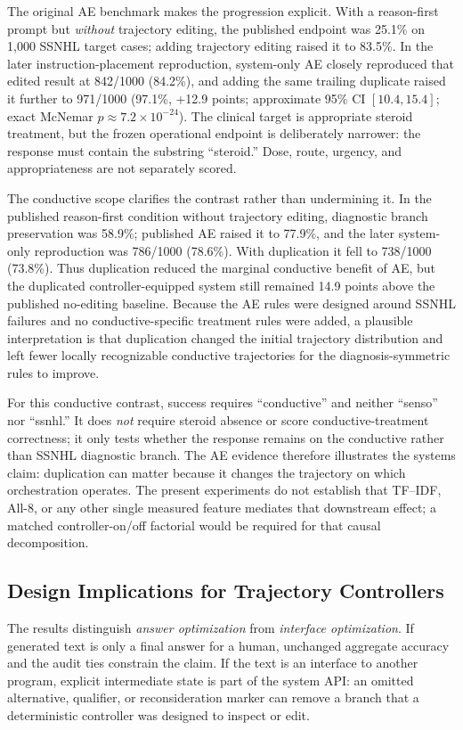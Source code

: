\documentclass[10pt]{article}
\begin{document}
The original AE benchmark makes the progression explicit. With a reason-first prompt but \emph{without} trajectory editing, the published endpoint was 25.1\% on 1,000 SSNHL target cases; adding trajectory editing raised it to 83.5\%. In the later instruction-placement reproduction, system-only AE closely reproduced that edited result at 842/1000 (84.2\%), and adding the same trailing duplicate raised it further to 971/1000 (97.1\%, +12.9 points; approximate 95\% CI $[10.4,15.4]$; exact McNemar $p\approx7.2\times10^{-24}$). The clinical target is appropriate steroid treatment, but the frozen operational endpoint is deliberately narrower: the response must contain the substring ``steroid.'' Dose, route, urgency, and appropriateness are not separately scored.

The conductive scope clarifies the contrast rather than undermining it. In the published reason-first condition without trajectory editing, diagnostic branch preservation was 58.9\%; published AE raised it to 77.9\%, and the later system-only reproduction was 786/1000 (78.6\%). With duplication it fell to 738/1000 (73.8\%). Thus duplication reduced the marginal conductive benefit of AE, but the duplicated controller-equipped system still remained 14.9 points above the published no-editing baseline. Because the AE rules were designed around SSNHL failures and no conductive-specific treatment rules were added, a plausible interpretation is that duplication changed the initial trajectory distribution and left fewer locally recognizable conductive trajectories for the diagnosis-symmetric rules to improve.

For this conductive contrast, success requires ``conductive'' and neither ``senso'' nor ``ssnhl.'' It does \emph{not} require steroid absence or score conductive-treatment correctness; it only tests whether the response remains on the conductive rather than SSNHL diagnostic branch. The AE evidence therefore illustrates the systems claim: duplication can matter because it changes the trajectory on which orchestration operates. The present experiments do not establish that TF--IDF, All-8, or any other single measured feature mediates that downstream effect; a matched controller-on/off factorial would be required for that causal decomposition.

\subsection{Design Implications for Trajectory Controllers}
The results distinguish \emph{answer optimization} from \emph{interface optimization}. If generated text is only a final answer for a human, unchanged aggregate accuracy and the audit ties constrain the claim. If the text is an interface to another program, explicit intermediate state is part of the system API: an omitted alternative, qualifier, or reconsideration marker can remove a branch that a deterministic controller was designed to inspect or edit.
\end{document}

